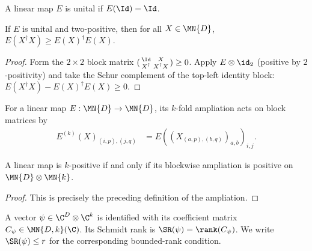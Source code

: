 \begin{definition}\label{def:unital_linear_map}
    \leanok
    A linear map $E$ is unital if $E(\Id)=\Id$.
\end{definition}

\begin{theorem}\label{thm:kadison_schwarz_2positive}
    \leanok
    If $E$ is unital and two-positive, then for all $X\in\MN{D}$,
    $E(X^\dagger X)\ge E(X)^\dagger E(X)$.
\end{theorem}

\begin{proof}
    \leanok
    Form the $2\times 2$ block matrix
    $(\begin{smallmatrix} \Id & X \\ X^\dagger & X^\dagger X \end{smallmatrix})\ge0$.
    Apply $E\otimes\id_{2}$ (positive by $2$-positivity) and take the Schur
    complement of the top-left identity block:
    $E(X^\dagger X)-E(X)^\dagger E(X)\ge0$.
\end{proof}

\begin{definition}\label{def:blockwise_ampliation}
    \leanok
    For a linear map $E : \MN{D}\to\MN{D}$, its $k$-fold ampliation acts on
    block matrices by
    \begin{align}
        E^{(k)}(X)_{(i,p),(j,q)}
         & =E((X_{(a,p),(b,q)})_{a,b})_{i,j}.
        \label{eq:schwarz_blockwise_ampliation}
    \end{align}
\end{definition}

\begin{theorem}
    \leanok
    A linear map is $k$-positive if and only if its blockwise ampliation is
    positive on $\MN{D}\otimes\MN{k}$.
\end{theorem}

\begin{proof}
    \leanok
    This is precisely the preceding definition of the ampliation.
\end{proof}

\begin{definition}\label{def:schmidt_rank}
    \leanok
    A vector $\psi\in\C^{D}\otimes\C^{k}$ is identified with its coefficient
    matrix $C_\psi\in \MN{D,k}(\C)$. Its Schmidt rank is
    $\SR(\psi)=\rank(C_\psi)$. We write $\SR(\psi)\le r$ for the corresponding
    bounded-rank condition.
\end{definition}

